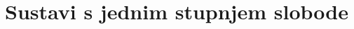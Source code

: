 \documentclass{rgn}
\begin{document}
\frontmatter
\tableofcontents
\newpage
\listoftables
\newpage
\listoffigures
\newpage
\mainmatter
\chapter{Sustavi s jednim stupnjem slobode}
%    
%    
%    
%    
%    
%    
%    
%    
%    
%    
%    
%    
%    
%    
%    
\nocite{*}

\printbibliography
\end{document}
